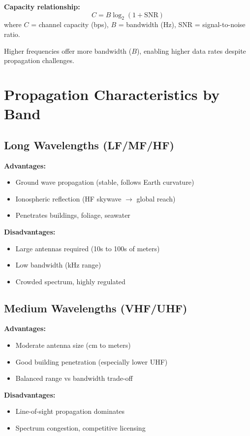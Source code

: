 \textbf{Capacity relationship:}
\begin{equation}
C = B \log_2(1 + \text{SNR})
\end{equation}
where $C$ = channel capacity (bps), $B$ = bandwidth (Hz), SNR = signal-to-noise ratio.

Higher frequencies offer more bandwidth ($B$), enabling higher data rates despite propagation challenges.

\section{Propagation Characteristics by Band}

\subsection{Long Wavelengths (LF/MF/HF)}

\textbf{Advantages:}
\begin{itemize}
\item Ground wave propagation (stable, follows Earth curvature)
\item Ionospheric reflection (HF skywave $\rightarrow$ global reach)
\item Penetrates buildings, foliage, seawater
\end{itemize}

\textbf{Disadvantages:}
\begin{itemize}
\item Large antennas required (10s to 100s of meters)
\item Low bandwidth (kHz range)
\item Crowded spectrum, highly regulated
\end{itemize}

\subsection{Medium Wavelengths (VHF/UHF)}

\textbf{Advantages:}
\begin{itemize}
\item Moderate antenna size (cm to meters)
\item Good building penetration (especially lower UHF)
\item Balanced range vs bandwidth trade-off
\end{itemize}

\textbf{Disadvantages:}
\begin{itemize}
\item Line-of-sight propagation dominates
\item Spectrum congestion, competitive licensing
\end{itemize}

